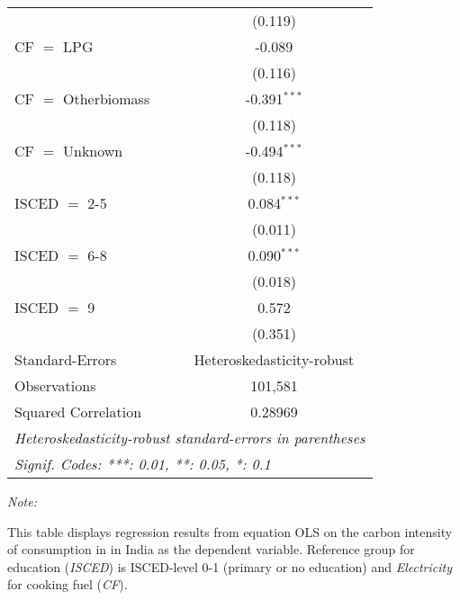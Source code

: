 \begin{table}[htbp!]
\begin{adjustbox}{width = 1\textwidth, max height = 0.95\textheight, center}
\begin{threeparttable}[b]
\begin{tabular}{lc}
                                & (0.119)\\   
            CF $=$ LPG          & -0.089\\   
                                & (0.116)\\   
            CF $=$ Otherbiomass & -0.391$^{***}$\\   
                                & (0.118)\\   
            CF $=$ Unknown      & -0.494$^{***}$\\   
                                & (0.118)\\   
            ISCED $=$ 2-5       & 0.084$^{***}$\\   
                                & (0.011)\\   
            ISCED $=$ 6-8       & 0.090$^{***}$\\   
                                & (0.018)\\   
            ISCED $=$ 9         & 0.572\\   
                                & (0.351)\\   
            \midrule 
            Standard-Errors     & Heteroskedasticity-robust \\   
            Observations        & 101,581\\  
            Squared Correlation & 0.28969\\  
            \midrule \midrule
            \multicolumn{2}{l}{\emph{Heteroskedasticity-robust standard-errors in parentheses}}\\
            \multicolumn{2}{l}{\emph{Signif. Codes: ***: 0.01, **: 0.05, *: 0.1}}\\
         \end{tabular}
         
         \begin{tablenotes}\item \medskip \textit{Note:}
            \item This table displays regression results from equation OLS on the carbon intensity of consumption in  in India as the dependent variable. Reference group for education (\textit{ISCED}) is ISCED-level 0-1 (primary or no education) and \textit{Electricity} for cooking fuel (\textit{CF}).
         \end{tablenotes}
      \end{threeparttable}
   \end{adjustbox}
\end{table}


